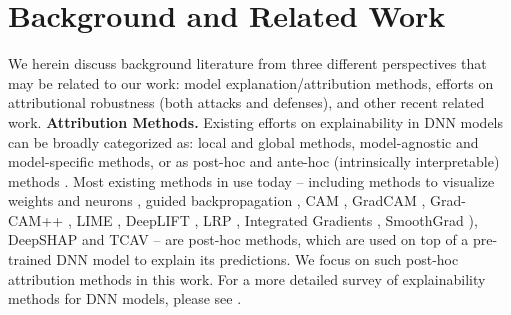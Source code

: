 \documentclass[letterpaper]{article} %
\begin{document}
\section{Background and Related Work}
\label{sec_related_work}
We herein discuss background literature from three different perspectives that may be related to our work: model explanation/attribution methods, efforts on attributional robustness (both attacks and defenses), and other recent related work.
\noindent \textbf{Attribution Methods.} Existing efforts on explainability in DNN models can be broadly categorized as: local and global methods, model-agnostic and model-specific methods, or as post-hoc and ante-hoc (intrinsically interpretable) methods \citep{molnar2019,xaitutorial}. Most existing methods in use today -- including methods to visualize weights and neurons \citep{simonyan2014deep,ZeilerF14}, guided backpropagation \citep{springenberg2015striving}, CAM \citep{ZhouKLOT16}, GradCAM \citep{Selvaraju_2019}, Grad-CAM++ \citep{Chattopadhay_2018}, LIME \citep{ribeiro2016why}, DeepLIFT \citep{shrikumar2017just,shrikumar2019learning}, LRP \citep{bach2015lrp}, Integrated Gradients \citep{SundararajanTY17}, SmoothGrad \citep{smilkov2017smoothgrad}), DeepSHAP \citep{lundberg2017unified} and TCAV \citep{kim2018interpretability} -- are post-hoc methods, which are used on top of a pre-trained DNN model to explain its predictions. We focus on such post-hoc attribution methods in this work. For a more detailed survey of explainability methods for DNN models, please see \citep{xaitutorial,molnar2019,samek_explainable_2019}.
\end{document}
